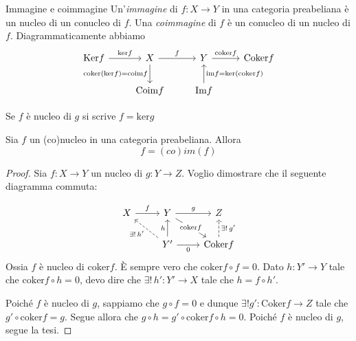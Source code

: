 \begin{definition}{Immagine e coimmagine}
    Un'\emph{immagine} di \(f : X \to Y\) in una categoria preabeliana è un
    nucleo di un conucleo di \(f\). Una \emph{coimmagine} di \(f\) è un conucleo
    di un nucleo di \(f\). Diagrammaticamente abbiamo
\[\begin{tikzcd}
	\mathrm{Ker}f & X & Y & \mathrm{Coker}f \\
	& \mathrm{Coim}f & \mathrm{Im}f
	\arrow["{\mathrm{ker}f}", from=1-1, to=1-2]
	\arrow["f", from=1-2, to=1-3]
	\arrow["{\mathrm{coker}f}", from=1-3, to=1-4]
\arrow["{\mathrm{coker}{(\mathrm{ker}f)} = \mathrm{coim}f}"', from=1-2, to=2-2]
\arrow["{\mathrm{im}f = \mathrm{ker}{(\mathrm{coker}f)}}"', from=2-3, to=1-3]
\end{tikzcd}\]
\end{definition}
\begin{note}[zione]
    Se \(f\) è nucleo di \(g\) si scrive \(f = \mathrm{ker}g\) 
\end{note}
\begin{proposition}{}
    Sia \(f\) un (co)nucleo in una categoria preabeliana. Allora \[f = (co)im(f)\]
\end{proposition}

\begin{proof}{}
    Sia \(f :X \to Y\) un nucleo di \(g : Y \to Z\). Voglio dimostrare che
    il seguente diagramma commuta:
    
\[\begin{tikzcd}
	X & Y & Z \\
	& {Y'} & {\mathrm{Coker}f}
	\arrow["f", from=1-1, to=1-2]
	\arrow["g", from=1-2, to=1-3]
	\arrow["{\mathrm{coker}f}"{description}, from=1-2, to=2-3]
	\arrow["{\exists!\,h'}", dashed, from=2-2, to=1-1]
	\arrow["h", from=2-2, to=1-2]
	\arrow["0"', from=2-2, to=2-3]
	\arrow["{\exists!\,g'}"', dashed, from=2-3, to=1-3]
\end{tikzcd}\]
    Ossia \(f\) è nucleo di \(\mathrm{coker}f\). È sempre vero che
    \(\mathrm{coker}f \circ f = 0\). Dato \(h : Y' \to Y\) tale che
    \(\mathrm{coker}f \circ h = 0\), devo dire che \(\exists !\, h' : Y'\to X\)
    tale che \(h = f \circ h'\).

    Poiché \(f\) è nucleo di \(g\), sappiamo che \(g \circ f = 0\) e dunque
    \(\exists ! g' : \mathrm{Coker}f \to Z\) tale che \(g' \circ \mathrm{coker}f
    = g\). Segue allora che \(g \circ h = g' \circ \mathrm{coker}f \circ h =
    0\). Poiché \(f\) è nucleo di \(g\), segue la tesi.

\end{proof}

